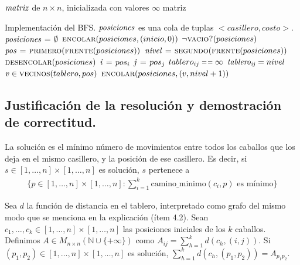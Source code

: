 \vspace*{0.3cm}


\begin{codebox}
\li \Comment $\id{matriz}$ de $n \times n$, inicializada con valores $\infty$
\li \Return matriz
\end{codebox}


\vspace*{0.3cm}


\begin{codebox}
\li \Comment Implementación del BFS.
\li \Comment $\id{posiciones}$ es una cola de tuplas $<casillero,costo>$.
\li $\id{posiciones} \gets \emptyset$
\li $\textnormal{\scshape encolar}(posiciones, (inicio,0))$
\li \While $\lnot \textnormal{\scshape vacio?}(posiciones)$ \Do
\li   $\id{pos} \gets \proc{primero}(\proc{frente}(posiciones))$
\li   $\id{nivel} \gets \proc{segundo}(\proc{frente}(posiciones))$
\li   $\textnormal{\scshape desencolar}(posiciones)$
\li   $\id{i} \gets pos_i$
\li   $\id{j} \gets pos_j$
\li   \If $tablero_{ij} \isequal \infty$ \Then
\li     $\id{tablero_{ij}} = nivel$
\li     \For $\id{v} \in \proc{vecinos}(tablero,pos)$ \Do
\li       $\textnormal{\scshape encolar}(posiciones,(v,nivel + 1))$
        \End
      \End
    \End
\end{codebox}



\newpage
\subsection{Justificación de la resolución y demostración de correctitud.}

\vspace*{0.3cm}

La solución es el mínimo número de movimientos entre todos los caballos que
los deja en el mismo casillero, y la posición de ese casillero. Es decir, si
$s \in [1, \dots, n] \times [1, \dots, n]$ es solución, $s$ pertenece a
\begin{align*}
\{p \in [1, \dots, n] \times [1, \dots, n] : \sum_{i = 1}^k
\text{camino\_minimo}(c_i, p) \text{ es mínimo}\}
\end{align*}

Sea $d$ la función de distancia en el tablero, interpretado como grafo del
mismo modo que se menciona en la explicación (ítem 4.2).
Sean $c_1, \dots, c_k \in [1, \dots, n] \times [1, \dots, n]$ las posiciones
iniciales de los $k$ caballos. Definimos $A \in M_{n \times n}(\mathbb{N} \cup
\{+\infty\})$ como $A_{ij} = \sum_{h=1}^k d(c_h, (i, j))$. Si $(p_1, p_2) \in
[1, \dots, n] \times [1, \dots, n]$ es solución, $\sum_{h=1}^k d(c_h, (p_1,
p_2)) = A_{p_1 p_2}$.

